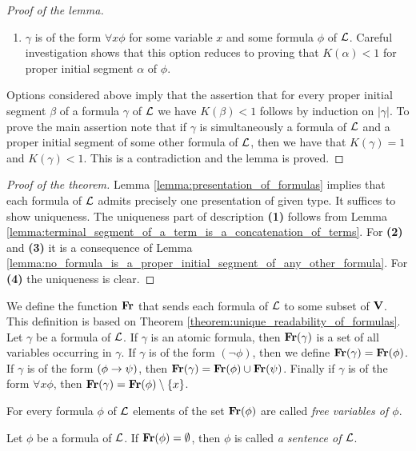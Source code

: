 \begin{proof}[Proof of the lemma]
\begin{enumerate}[label=\textbf{(\arabic*)}, leftmargin=3.0em]
\item $\gamma$ is of the form $\forall x \phi$ for some variable $x$ and some formula $\phi$ of ${\mathcal L}$. Careful investigation shows that this option reduces to proving that $K(\alpha) < 1$ for proper initial segment $\alpha$ of $\phi$.
\end{enumerate}
Options considered above imply that the assertion that for every proper initial segment $\beta$ of a formula $\gamma$ of ${\mathcal L}$ we have $K(\beta) < 1$ follows by induction on $|\gamma|$. To prove the main assertion note that if $\gamma$ is simultaneously a formula of ${\mathcal L}$ and a proper initial segment of some other formula of ${\mathcal L}$, then we have that $K(\gamma) = 1$ and $K(\gamma) < 1$. This is a contradiction and the lemma is proved.
\end{proof}

\begin{proof}[Proof of the theorem]
Lemma \ref{lemma:presentation_of_formulas} implies that each formula of ${\mathcal L}$ admits precisely one presentation of given type. It suffices to show uniqueness. The uniqueness part of description \textbf{(1)} follows from Lemma \ref{lemma:terminal_segment_of_a_term_is_a_concatenation_of_terms}. For \textbf{(2)} and \textbf{(3)} it is a consequence of Lemma \ref{lemma:no_formula_is_a_proper_initial_segment_of_any_other_formula}. For \textbf{(4)} the uniqueness is clear.
\end{proof}
\noindent
We define the function $\mathbf{Fr}$ that sends each formula of ${\mathcal L}$ to some subset of $\mathbf{V}$. This definition is based on Theorem \ref{theorem:unique_readability_of_formulas}. Let $\gamma$ be a formula of ${\mathcal L}$. If $\gamma$ is an atomic formula, then $\mathbf{Fr}(\gamma)$ is a set of all variables occurring in $\gamma$. If $\gamma$ is of the form $(\neg \phi)$, then we define $\mathbf{Fr}(\gamma) = \mathbf{Fr}(\phi)$. If $\gamma$ is of the form $(\phi \rightarrow \psi)$, then $\mathbf{Fr}(\gamma) = \mathbf{Fr}(\phi)\cup \mathbf{Fr}(\psi)$. Finally if $\gamma$ is of the form $\forall x\phi$, then $\mathbf{Fr}(\gamma) = \mathbf{Fr}(\phi) \setminus \{x\}$.

\begin{definition}
For every formula $\phi$ of ${\mathcal L}$ elements of the set $\mathbf{Fr}(\phi)$ are called \textit{free variables of $\phi$}.
\end{definition}

\begin{definition}
Let $\phi$ be a formula of ${\mathcal L}$. If $\mathbf{Fr}(\phi)=\emptyset$, then $\phi$ is called \textit{a sentence of ${\mathcal L}$}.
\end{definition}

